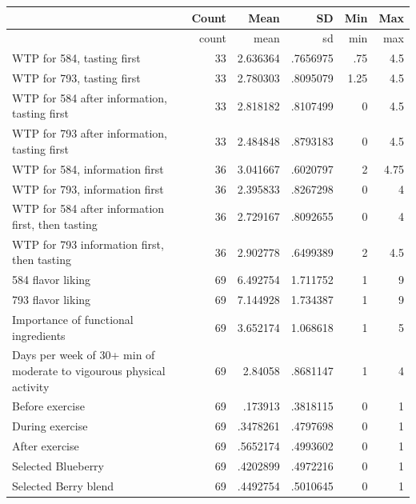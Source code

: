 \begin{tabular*}{\textwidth}{@{\extracolsep{\fill}}l*{5}{r}} \toprule & Count & Mean & SD & Min & Max \\ \midrule
                    &       count&        mean&          sd&         min&         max\\
\midrule
WTP for 584, tasting first&          33&    2.636364&    .7656975&         .75&         4.5\\
WTP for 793, tasting first&          33&    2.780303&    .8095079&        1.25&         4.5\\
WTP for 584 after information, tasting first&          33&    2.818182&    .8107499&           0&         4.5\\
WTP for 793 after information, tasting first&          33&    2.484848&    .8793183&           0&         4.5\\
WTP for 584, information first&          36&    3.041667&    .6020797&           2&        4.75\\
WTP for 793, information first&          36&    2.395833&    .8267298&           0&           4\\
WTP for 584 after information first, then tasting&          36&    2.729167&    .8092655&           0&           4\\
WTP for 793 information first, then tasting&          36&    2.902778&    .6499389&           2&         4.5\\
584 flavor liking   &          69&    6.492754&    1.711752&           1&           9\\
793 flavor liking   &          69&    7.144928&    1.734387&           1&           9\\
Importance of functional ingredients&          69&    3.652174&    1.068618&           1&           5\\
Days per week of 30+ min of moderate to vigourous physical activity&          69&     2.84058&    .8681147&           1&           4\\
Before exercise     &          69&     .173913&    .3818115&           0&           1\\
During exercise     &          69&    .3478261&    .4797698&           0&           1\\
After exercise      &          69&    .5652174&    .4993602&           0&           1\\
Selected Blueberry  &          69&    .4202899&    .4972216&           0&           1\\
Selected Berry blend&          69&    .4492754&    .5010645&           0&           1\\

\end{tabular*}
